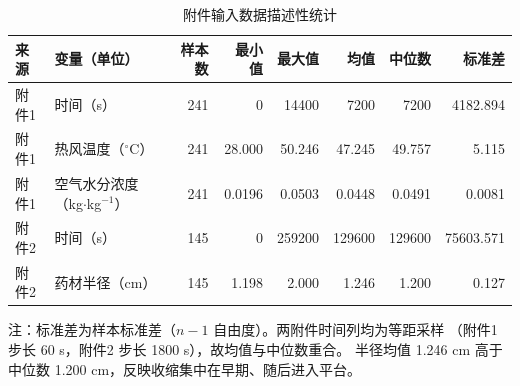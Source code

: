 \begin{table}[H]
  \centering
  \caption{附件输入数据描述性统计}
  \label{tab:data_stats}
  \small
  \begin{tabular}{llrrrrrr}
    \toprule
    来源 & 变量（单位） & 样本数 & 最小值 & 最大值 & 均值 & 中位数 & 标准差 \\
    \midrule
    附件1 & 时间（s）                          & 241 & 0      & 14400  & 7200   & 7200   & 4182.894 \\
    附件1 & 热风温度（$^\circ$C）              & 241 & 28.000 & 50.246 & 47.245 & 49.757 & 5.115 \\
    附件1 & 空气水分浓度（kg$\cdot$kg$^{-1}$）  & 241 & 0.0196 & 0.0503 & 0.0448 & 0.0491 & 0.0081 \\
    \midrule
    附件2 & 时间（s）                          & 145 & 0      & 259200 & 129600 & 129600 & 75603.571 \\
    附件2 & 药材半径（cm）                     & 145 & 1.198  & 2.000  & 1.246  & 1.200  & 0.127 \\
    \bottomrule
  \end{tabular}

  \vspace{2pt}
  \parbox{0.92\linewidth}{\footnotesize
  注：标准差为样本标准差（$n-1$ 自由度）。两附件时间列均为等距采样
  （附件1 步长 60 s，附件2 步长 1800 s），故均值与中位数重合。
  半径均值 1.246 cm 高于中位数 1.200 cm，反映收缩集中在早期、随后进入平台。}
\end{table}
